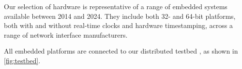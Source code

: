 Our selection of hardware is representative
of a range of embedded systems available between 2014 and 2024.
They include both 32- and 64-bit platforms,
both with and without real-time clocks and hardware timestamping,
across a range of network interface manufacturers.

All embedded platforms are connected to our distributed testbed \toolName{},
as shown in \cref{fig:testbed}.


